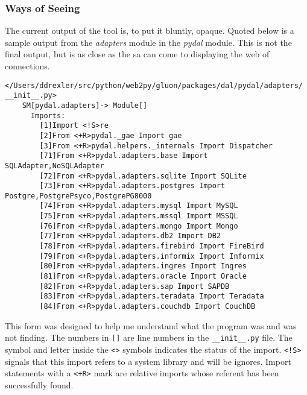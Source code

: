 \documentclass[a4paper,man,natbib,floatsintext]{apa6}
\begin{document}
  \subsubsection{Ways of Seeing}
  The current output of the tool is, to put it bluntly, opaque. Quoted below is a sample output from the \textit{adapters} module in the \textit{pydal} module. This is not the final output, but is as close as the \gls{sa} can come to displaying the web of connections. 

  \singlespace
  \begin{Verbatim}[fontsize=\small]
    </Users/ddrexler/src/python/web2py/gluon/packages/dal/pydal/adapters/ __init__.py>
    SM[pydal.adapters]-> Module[]
      Imports:
        [1]Import <!S>re
        [2]From <+R>pydal._gae Import gae
        [3]From <+R>pydal.helpers._internals Import Dispatcher
        [71]From <+R>pydal.adapters.base Import SQLAdapter,NoSQLAdapter
        [72]From <+R>pydal.adapters.sqlite Import SQLite
        [73]From <+R>pydal.adapters.postgres Import Postgre,PostgrePsyco,PostgrePG8000
        [74]From <+R>pydal.adapters.mysql Import MySQL
        [75]From <+R>pydal.adapters.mssql Import MSSQL
        [76]From <+R>pydal.adapters.mongo Import Mongo
        [77]From <+R>pydal.adapters.db2 Import DB2
        [78]From <+R>pydal.adapters.firebird Import FireBird
        [79]From <+R>pydal.adapters.informix Import Informix
        [80]From <+R>pydal.adapters.ingres Import Ingres
        [81]From <+R>pydal.adapters.oracle Import Oracle
        [82]From <+R>pydal.adapters.sap Import SAPDB
        [83]From <+R>pydal.adapters.teradata Import Teradata
        [84]From <+R>pydal.adapters.couchdb Import CouchDB
  \end{Verbatim}
  \doublespace

  This form was designed to help me understand what the program was and was not finding. The numbers in \verb|[]| are line numbers in the \verb|__init__.py| file. The symbol and letter inside the \verb|<>| symbols indicates the status of the import. \verb|<!S>| signals that this import refers to a system library and will be ignores. Import statements with a \verb|<+R>| mark are relative imports whose referent has been successfully found\footnotemark. 

\end{document}

